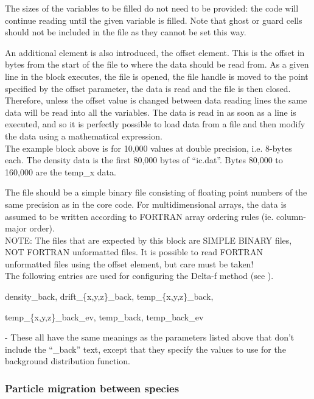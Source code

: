 The sizes of the variables to be filled do not need to be provided: the
code will continue reading until the given variable is filled. 
Note that ghost or guard cells should not be included in the file as
they cannot be set this way. 

An additional element is also introduced, the offset element. This
is the offset in bytes from the start of the file to where the data should
be read from. As a given line in the block executes, the file is opened, the
file handle is moved to the point specified by the offset parameter, the data
is read and the file is then closed. Therefore, unless the offset value is
changed between data reading lines the same data will be read into all the
variables. The data is read in as soon as a line is executed, and so it is
perfectly possible to load data from a file and then modify the data using
a mathematical expression.\\

The example block above is for 10,000 values at double precision, i.e. 8-bytes 
each. The density data is the first 80,000 bytes of ``ic.dat''. Bytes 80,000
to 160,000 are the temp\_x data.

The file should be a simple binary file consisting of floating point numbers of
the same precision as  in the core {\EPOCH} code. For
multidimensional arrays, the data is assumed to be written according to
FORTRAN array ordering rules (ie. column-major order).\\

{\emphtext NOTE: The files that are expected by this block are SIMPLE BINARY
files, NOT FORTRAN unformatted files. It is possible to read FORTRAN
unformatted files using the offset element, but care must be taken!}\\

The following entries are used for configuring the Delta-f method
(see ).\\

{\emphtext density\_back, drift\_\{x,y,z\}\_back, temp\_\{x,y,z\}\_back,
\par temp\_\{x,y,z\}\_back\_ev, temp\_back, temp\_back\_ev}
 - These all have the same
meanings as the parameters listed above that don't include the ``\_back'' text,
except that they specify the values to use for the background distribution
function.\\

\subsubsection{Particle migration between species}
\label{sec:migration}

